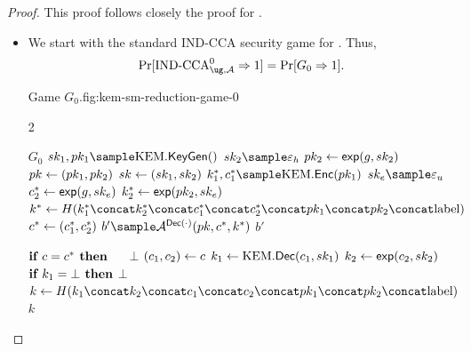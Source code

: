 \begin{proof}
    This proof follows closely the proof for \cite[Theorem 1]{PKC:GiaHeuPoe18}.
    \begin{itemize}
    \item[\textbf{Game 0}]
        We start with the standard IND-CCA security game for \ug.
        Thus,
        \[ \prone{\cca^0_{\ug, \adversary{A}}} = \prone{G_0}. \]
        \begin{gamefigure}{Game $G_0$.}{fig:kem-sm-reduction-game-0}
            \begin{games}{2}
                \begin{gameenv}{\game $G_0$}
                    \State $\sk_1, \pk_1 \sample \kem.\keygen()$
                    \State $\sk_2 \sample \honestexponent$
                    \State $pk_2 \leftarrow \textsf{exp}(g, sk_2)$
                    \State $pk \leftarrow (pk_1, pk_2)$
                    \State $sk \leftarrow (sk_1, sk_2)$
                    \State $k^*_1, c^*_1 \sample \kem.\enc(\pk_1)$
                    \State $\sk_e \sample \exponent$
                    \State $c^*_2 \leftarrow \textsf{exp}(g, sk_e)$
                    \State $k^*_2 \leftarrow \textsf{exp}(pk_2, sk_e)$
                    \State $k^* \assign H(\hashinputchallenges)$
                    \State $c^* \leftarrow (c_1^*, c_2^*)$
                    \State $b' \sample \adversary{A}^{\dec(\cdot)}(\pk, c^*, k^*)$
                    \State \Return $b'$
                \end{gameenv}
                \gamebreak
                \begin{gameenv}{\oracledec}
                    \State $\textbf{if } c = c^* \textbf{ then}$
                    \State $\quad$ \Return $\bot$
                    \State $(c_1, c_2) \leftarrow c$
                    \State $k_1 \leftarrow \text{KEM}.\textsf{Dec}(c_1, sk_1)$
                    \State $k_2 \leftarrow \textsf{exp}(c_2, sk_2)$
                    \State $\textbf{if } k_1 = \bot \textbf{ then}$
                    \State \quad \Return $\bot$
                    \State $k \assign H(\hashinput)$
                    \State \Return $k$
                \end{gameenv}
            \end{games}
        \end{gamefigure}

    \end{itemize}


\end{proof}
